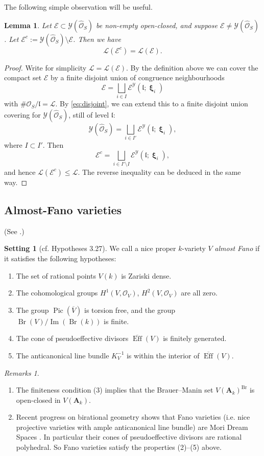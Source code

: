 \documentclass[11pt,letterpaper]{amsart}
\newcommand{\CE}{{\mathcal {E}}}
\newcommand{\CL}{{\mathcal {L}}}
\newcommand{\CO}{{\mathcal {O}}}
\newcommand{\CY}{{\mathcal {Y}}}
\newcommand{\RA}{{\mathbf {A}}}
\newcommand{\Pic}{\operatorname{Pic}}
\DeclareMathOperator{\bxi}{\mathbf{\xi}}
\theoremstyle{plain}
\numberwithin{equation}{section}
\newtheorem{lemma}[theorem]{Lemma}
\theoremstyle{definition}
\newtheorem{hypothesis}[theorem]{Setting}
\theoremstyle{remark}
\newtheorem{remarks}[theorem]{Remarks}
\begin{document}
The following simple observation will be useful.
\begin{lemma}\label{le:CLCEfc}
	Let $\CE\subset \CY(\widehat{\CO}_S)$ be non-empty open-closed, and suppose $\CE\neq \CY(\widehat{\CO}_S)$. Let $\CE^c:=\CY(\widehat{\CO}_S)\setminus \CE$. Then we have $$\CL(\CE^c)=\CL(\CE).$$ 
\end{lemma}
\begin{proof}
		Write for simplicity $\CL=\CL(\CE)$. By the definition above we can cover the compact set  $\CE$ by a finite disjoint union of congruence neighbourhoods   $$\CE=\bigsqcup_{i\in I}\CE^\CY(\mathfrak{l};\bxi_i)$$ with $\#\CO_S/\mathfrak{l}=\CL$. 
		By \eqref{eq:disjoint}, we can extend this to a finite disjoint union covering for $\CY(\widehat{\CO}_S)$, still of level $\mathfrak{l}$:
		$$\CY(\widehat{\CO}_S)=\bigsqcup_{i\in I'} \CE^\CY(\mathfrak{l};\bxi_i),$$ where $I\subset I'$.
	Then $$\CE^c=\bigsqcup_{i\in I'\setminus I} \CE^\CY(\mathfrak{l};\bxi_i),$$ and hence $\CL(\CE^c)\leqslant \CL$. The reverse inequality can be deduced in the same way.
\end{proof}
\subsection{Almost-Fano varieties}\label{se:heightsTamagawa}
(See \cite[\S3.4.2]{PeyreBeyond}.)
\begin{hypothesis}[cf. \cite{PeyreBeyond} Hypotheses 3.27]\label{def:almostFano}
	We call a nice proper $k$-variety $V$ \emph{almost Fano} if it satisfies the following hypotheses:
	\begin{enumerate}
		\item The set of rational points $V(k)$ is Zariski dense.
		\item The cohomological groups $H^1(V,\CO_V)$, $H^2(V,\CO_V)$ are all zero.
		\item The group $\Pic(\overline{V})$ is torsion free, and the group $\operatorname{Br}(V)/\operatorname{Im}(\operatorname{Br}(k))$ is finite.
		\item The cone of pseudoeffective divisors $\overline{\operatorname{Eff}}(V)$ is finitely generated.
		\item  The anticanonical line bundle $K_V^{-1}$ is within the interior of $\overline{\operatorname{Eff}}(V)$. 
	\end{enumerate}
	\begin{remarks}
		\hfill
		\begin{enumerate}
			\item The finiteness condition (3) implies that the Brauer--Manin set $V(\RA_k)^{\operatorname{Br}}$ is open-closed in $V(\RA_k)$.
			\item 		Recent progress on birational geometry shows that Fano varieties (i.e. nice projective varieties with ample anticanonical line bundle) are Mori Dream Spaces \cite[Corollary 1.3.2]{BCHM}. In particular their cones of pseudoeffective divisors are rational polyhedral. So Fano varieties satisfy the properties (2)--(5) above.
		\end{enumerate}
	\end{remarks}
\end{hypothesis}
\end{document}
